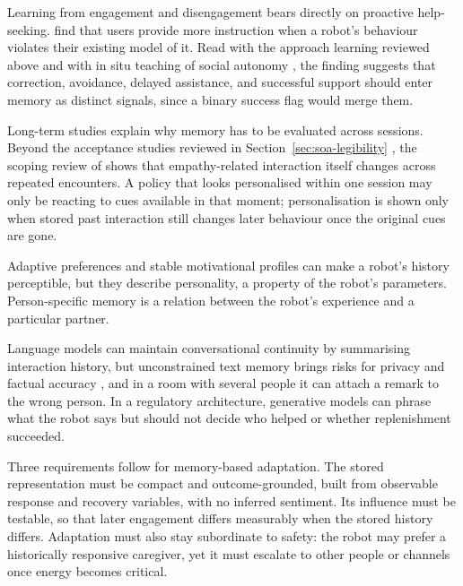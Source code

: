 Learning from engagement and disengagement bears directly on proactive help-seeking. \citet{Mihhailov2025GuideUnexpected} find that users provide more instruction when a robot's behaviour violates their existing model of it. Read with the approach learning reviewed above \citep{Raggioli2025ApproachingBehavior} and with in situ teaching of social autonomy \citep{Senft2019SocialAutonomy}, the finding suggests that correction, avoidance, delayed assistance, and successful support should enter memory as distinct signals, since a binary success flag would merge them.

Long-term studies explain why memory has to be evaluated across sessions. Beyond the acceptance studies reviewed in Section~\ref{sec:soa-legibility} \citep{DeGraaf2016LongTermAcceptance,Matheus2025LongTerm}, the scoping review of \citet{Newman2025EmpathyLongTerm} shows that empathy-related interaction itself changes across repeated encounters. A policy that looks personalised within one session may only be reacting to cues available in that moment; personalisation is shown only when stored past interaction still changes later behaviour once the original cues are gone.

Adaptive preferences \citep{MarotoGomez2025RobotCompanion} and stable motivational profiles \citep{Berto2025CuriosityAffect} can make a robot's history perceptible, but they describe personality, a property of the robot's parameters. Person-specific memory is a relation between the robot's experience and a particular partner.

Language models can maintain conversational continuity by summarising interaction history, but unconstrained text memory brings risks for privacy and factual accuracy \citep{Wang2026LLMHRISystematic,PintoBernal2025Designing,Ghamati2025PersonalisedLLM}, and in a room with several people it can attach a remark to the wrong person. In a regulatory architecture, generative models can phrase what the robot says but should not decide who helped or whether replenishment succeeded.

Three requirements follow for memory-based adaptation. The stored representation must be compact and outcome-grounded, built from observable response and recovery variables, with no inferred sentiment. Its influence must be testable, so that later engagement differs measurably when the stored history differs. Adaptation must also stay subordinate to safety: the robot may prefer a historically responsive caregiver, yet it must escalate to other people or channels once energy becomes critical.

